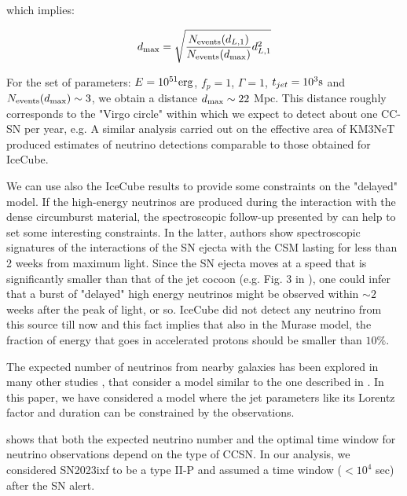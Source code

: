 \documentclass[twocolumn]{aastex631}
\begin{document}
which implies:

\begin{equation}
    d_{\rm max}= \sqrt{\frac{N_{\rm events}(d_{L,1})}{{ N_{\rm events}(d_{\rm max})} } d_{L,1}^2 }
\end{equation}

For the set of parameters: $E=10^{51} \rm erg$, $f_p=1$, $\Gamma=1$, $t_{jet}=10^3 \rm s$ and $N_{\rm events}(d_{\rm max})\sim3$, we obtain a distance $d_{\rm max}\sim 22 $ Mpc. This distance roughly corresponds to the "Virgo circle" within which we expect to detect about one CC-SN per year, e.g. \citep{Cappellaro2015, Botticella2017,burderi2020} 
A similar analysis carried out on the effective area of KM3NeT produced estimates of neutrino detections comparable to those obtained for IceCube.
\smallskip

We can use also the IceCube results to provide some constraints on the \cite{Murase2011} "delayed" model. If the high-energy neutrinos are produced during the interaction with the dense circumburst material, the spectroscopic follow-up presented by \citep{Yamanaka2023} can help to set some interesting constraints. In the latter, authors show spectroscopic signatures of the interactions of the SN ejecta with the CSM lasting for less than 2 weeks from maximum light. Since the SN ejecta moves at a speed that is significantly smaller than that of the jet cocoon (e.g. Fig. 3 in \cite{Izzo2019}), one could infer that a burst of "delayed" high energy neutrinos might be observed within $\sim 2$ weeks after the peak of light, or so. IceCube did not detect any neutrino from this source till now \citep{IceCubeSN2023} and this fact implies that also in the Murase model, the fraction of energy that goes in accelerated protons should be smaller than $10\%$.

The expected number of neutrinos from nearby galaxies has been explored in many other studies \citep{Murase2018,Murase2022,Murase2023,valtonen2023}, that consider a model similar to the one described in \cite{Murase2011}. In this paper, we have considered a model where the jet parameters like its Lorentz factor and duration can be constrained by the observations. 


\cite{Murase2018} shows that both the expected neutrino number and the
optimal time window for neutrino observations depend on the type of
CCSN. In our analysis, we considered SN2023ixf to be a type II-P and assumed a time window ($<10^4$ sec) after the SN alert.

 
\end{document}
